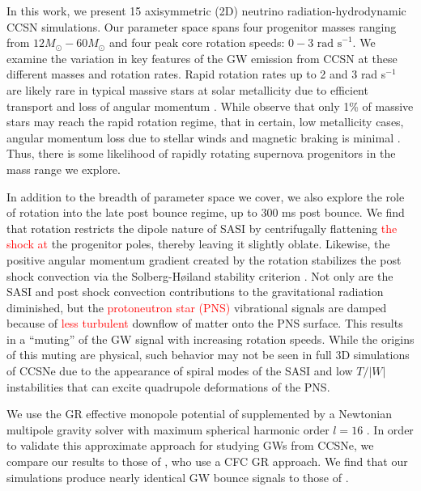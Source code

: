 \documentclass[twocolumn,times]{aastex62}  %
\begin{document}
In this work, we present 15 axisymmetric (2D) neutrino radiation-hydrodynamic CCSN simulations.  
Our parameter space spans four progenitor masses ranging from $12M_\odot-60M_\odot$ \citep{Suk:2016} and four peak core rotation speeds: $0-3 \text{ rad s}^{-1}$.  
We examine the variation in key features of the GW emission from CCSN at these different masses and rotation rates.
Rapid rotation rates up to 2 and 3 rad s$^{-1}$ are likely rare in typical massive stars at solar metallicity due to efficient transport and loss of angular momentum \citep{heger:2005}.
While \citet{woosley:2006} observe that only 1\% of massive stars may reach the rapid rotation regime, that in certain, low metallicity cases, angular momentum loss due to stellar winds and magnetic braking is minimal \citep{yoon:2005}.  Thus, there is some likelihood of rapidly rotating supernova progenitors in the mass range we explore.  



In addition to the breadth of parameter space we cover, we also explore the role of rotation into the late post bounce regime, up to 300 ms post bounce.  
We find that rotation restricts the dipole nature of SASI by centrifugally flattening \textcolor{red}{the shock at} the progenitor poles, thereby leaving it slightly oblate. Likewise, the positive angular momentum gradient created by the rotation stabilizes the post shock convection via the Solberg-H{\o}iland stability criterion \citep{endal:1978,fryer:2000}.  Not only are the SASI and post shock convection contributions to the gravitational radiation diminished, but the \textcolor{red}{protoneutron star (PNS)} vibrational signals are damped because of \textcolor{red}{less turbulent} downflow of matter onto the PNS surface.  
This results in a ``muting'' of the GW signal with increasing rotation speeds.
While the origins of this muting are physical, such behavior may not be seen in full 3D simulations of CCSNe due to the appearance of spiral modes of the SASI and low $T/|W|$ instabilities that can excite quadrupole deformations of the PNS. 

We use the GR effective monopole potential of \citet{marek:2006} supplemented by a Newtonian multipole gravity solver with maximum spherical harmonic order $l=16$ \citep{couch:2013a, oconnor:2018}.
In order to validate this approximate approach for studying GWs from CCSNe, we compare our results to those of \citet{richers:2017}, who use a CFC GR approach.  We find that our simulations produce nearly identical GW bounce signals to those of \citet{richers:2017}.  
\end{document}
